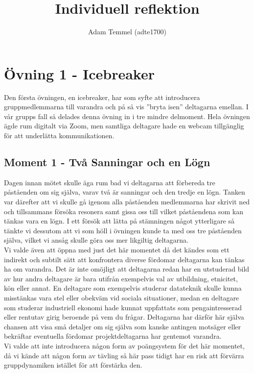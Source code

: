 \documentclass[a4paper, titlepage,12pt]{article}
\title{Individuell reflektion}
\author{Adam Temmel (adte1700)}
\begin{document}
	\maketitle
	\section{Övning 1 - Icebreaker}

		Den första övningen, en icebreaker, har som syfte att introducera gruppmedlemmarna till varandra och på så vis ''bryta isen'' deltagarna emellan. I vår grupps fall så delades denna övning in i tre mindre delmoment. Hela övningen ägde rum digitalt via Zoom, men samtliga deltagare hade en webcam tillgänglig för att underlätta kommunikationen.

		\subsection{Moment 1 - Två Sanningar och en Lögn}

			Dagen innan mötet skulle äga rum bad vi deltagarna att förbereda tre påståenden om sig själva, varav två är sanningar och den tredje en lögn. Tanken var därefter att vi skulle gå igenom alla påståenden medlemmarna har skrivit ned och tillsammans försöka resonera samt gissa oss till vilket påståendena som kan tänkas vara en lögn. I ett försök att lätta på stämningen något ytterligare så tänkte vi dessutom att vi som höll i övningen kunde ta med oss tre påståenden själva, vilket vi ansåg skulle göra oss mer likgiltig deltagarna.\\

			Vi valde även att öppna med just det här momentet då det kändes som ett indirekt och subtilt sätt att konfrontera diverse fördomar deltagarna kan tänkas ha om varandra. Det är inte omöjligt att deltagarna redan har en utstuderad bild av hur andra deltagare är bara utifrån exempelvis val av utbildning, etnicitet, kön eller annat. En deltagare som exempelvis studerar datateknik skulle kunna misstänkas vara stel eller obekväm vid sociala situationer, medan en deltagare som studerar industriell ekonomi hade kunnat uppfattats som pengaintresserad eller rentutav girig beroende på vem du frågar. Deltagarna har därför här själva chansen att visa små detaljer om sig själva som kanske antingen motsäger eller bekräftar eventuella fördomar projektdeltagarna har gentemot varandra.\\

			Vi valde att inte introducera någon form av poängsystem för det här momentet, då vi kände att någon form av tävling så här pass tidigt har en risk att förvärra gruppdynamiken istället för att förstärka den.
\end{document}
